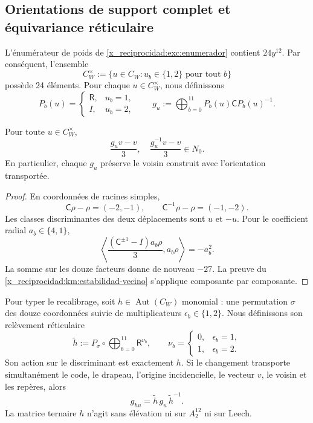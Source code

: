 \subsection{Orientations de support complet et équivariance réticulaire}
\label{x_reciprocidad:paper:24-orientaciones}

L’énumérateur de poids de \eqref{x_reciprocidad:exc:enumerador} contient
\(24y^{12}\). Par conséquent, l’ensemble
\[
 C_W^\times:=
 \{u\in C_W:u_b\in\{1,2\}\text{ pour tout }b\}
\]
possède 24 éléments. Pour chaque \(u\in C_W^\times\), nous définissons
\[
 P_b(u)=
 \begin{cases}
  \mathsf R,&u_b=1,\\
  I,&u_b=2,
 \end{cases}
 \qquad
 g_u:=\bigoplus_{b=0}^{11}P_b(u)\mathsf C P_b(u)^{-1}.
\]

\begin{proposition}
\label{x_reciprocidad:paper:robustez-orientaciones}
Pour toute \(u\in C_W^\times\),
\[
 \frac{g_uv-v}{3},
 \quad
 \frac{g_u^{-1}v-v}{3}
 \in N_0.
\]
En particulier, chaque \(g_u\) préserve le voisin construit avec
l’orientation transportée.
\end{proposition}

\begin{proof}
En coordonnées de racines simples,
\[
 \mathsf C\rho-\rho=(-2,-1),
 \qquad
 \mathsf C^{-1}\rho-\rho=(-1,-2).
\]
Les classes discriminantes des deux déplacements sont \(u\) et \(-u\).
Pour le coefficient radial \(a_b\in\{4,1\}\),
\[
 \left\langle
 \frac{(\mathsf C^{\pm1}-I)a_b\rho}{3},a_b\rho
 \right\rangle=-a_b^2.
\]
La somme sur les douze facteurs donne de nouveau \(-27\). La preuve du
\cref{x_reciprocidad:km:estabilidad-vecino} s’applique composante par
composante.
\end{proof}

Pour typer le recalibrage, soit
\(h\in\operatorname{Aut}(C_W)\) monomial : une permutation \(\sigma\) des
douze coordonnées suivie de multiplicateurs
\(\epsilon_b\in\{1,2\}\). Nous définissons son relèvement réticulaire
\begin{equation}
 \widetilde h
 :=P_\sigma\circ
 \bigoplus_{b=0}^{11}\mathsf R^{\nu_b},
 \qquad
 \nu_b=
 \begin{cases}
 0,&\epsilon_b=1,\\
 1,&\epsilon_b=2.
 \end{cases}
 \label{x_reciprocidad:paper:elevacion-monomial}
\end{equation}
Son action sur le discriminant est exactement \(h\). Si le changement transporte
simultanément le code, le drapeau, l’origine incidencielle, le vecteur \(v\), le voisin et les
repères, alors
\begin{equation}
 g_{hu}=\widetilde h\,g_u\,\widetilde h^{-1}.
 \label{x_reciprocidad:paper:naturalidad-isometrias}
\end{equation}
La matrice ternaire \(h\) n’agit sans élévation ni sur \(A_2^{12}\) ni sur
Leech.

